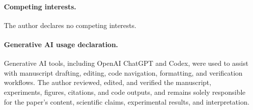 \documentclass[11pt]{article}
\begin{document}
\paragraph{Competing interests.}
The author declares no competing interests.

\paragraph{Generative AI usage declaration.}
Generative AI tools, including OpenAI ChatGPT and Codex, were used to assist with
manuscript drafting, editing, code navigation, formatting, and verification workflows.
The author reviewed, edited, and verified the manuscript, experiments, figures,
citations, and code outputs, and remains solely responsible for the paper's content,
scientific claims, experimental results, and interpretation.
\end{document}
